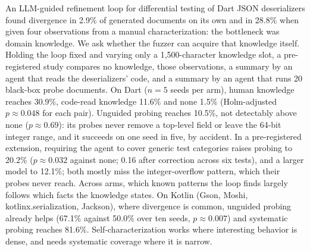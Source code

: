 An LLM-guided refinement loop for differential testing of Dart JSON
deserializers found divergence in 2.9\% of generated documents on its own
and in 28.8\% when given four observations from a manual characterization:
the bottleneck was domain knowledge. We ask whether the fuzzer can acquire
that knowledge itself. Holding the loop fixed and varying only a
1{,}500-character knowledge slot, a pre-registered study compares no
knowledge, those observations, a summary by an agent that reads the
deserializers' code, and a summary by an agent that runs 20 black-box probe
documents. On Dart ($n{=}5$ seeds per arm), human knowledge reaches 30.9\%,
code-read knowledge 11.6\% and none 1.5\% (Holm-adjusted $p \approx 0.048$
for each pair). Unguided probing reaches 10.5\%, not detectably above none
($p \approx 0.69$): its probes never remove a top-level field or leave the
64-bit integer range, and it succeeds on one seed in five, by accident. In
a pre-registered extension, requiring the agent to cover generic test
categories raises probing to 20.2\% ($p \approx 0.032$ against none; 0.16
after correction across six tests), and a larger model to 12.1\%; both
mostly miss the integer-overflow pattern, which their probes never reach. Across
arms, which known patterns the loop finds largely follows which facts the
knowledge states. On Kotlin (Gson, Moshi, kotlinx.serialization, Jackson),
where divergence is common, unguided probing already helps (67.1\% against
50.0\% over ten seeds, $p \approx 0.007$) and systematic probing reaches
81.6\%. Self-characterization works where interesting behavior is dense,
and needs systematic coverage where it is narrow.
